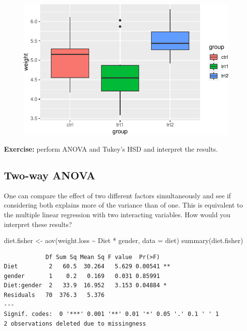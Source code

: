 \documentclass[
  letterpaper,
  DIV=11,
  numbers=noendperiod]{scrreprt}
\newenvironment{Shaded}{\begin{snugshade}}{\end{snugshade}}
\newcommand{\AttributeTok}[1]{\textcolor[rgb]{0.40,0.45,0.13}{#1}}
\newcommand{\FunctionTok}[1]{\textcolor[rgb]{0.28,0.35,0.67}{#1}}
\newcommand{\NormalTok}[1]{\textcolor[rgb]{0.00,0.23,0.31}{#1}}
\newcommand{\OtherTok}[1]{\textcolor[rgb]{0.00,0.23,0.31}{#1}}
\newcommand{\SpecialCharTok}[1]{\textcolor[rgb]{0.37,0.37,0.37}{#1}}
\begin{document}
\begin{figure}[H]

{\centering \includegraphics{./09-ANOVA_files/figure-pdf/unnamed-chunk-12-1.pdf}

}

\end{figure}

\textbf{Exercise:} perform ANOVA and Tukey's HSD and interpret the
results.

\hypertarget{two-way-anova}{%
\subsection{Two-way ANOVA}\label{two-way-anova}}

One can compare the effect of two different factors simultaneously and
see if considering both explains more of the variance than of one. This
is equivalent to the multiple linear regression with two interacting
variables. How would you interpret these results?

\begin{Shaded}
\begin{Highlighting}[]
\NormalTok{diet.fisher }\OtherTok{\textless{}{-}} \FunctionTok{aov}\NormalTok{(weight.loss }\SpecialCharTok{\textasciitilde{}}\NormalTok{ Diet }\SpecialCharTok{*}\NormalTok{ gender, }\AttributeTok{data =}\NormalTok{ diet)}
\FunctionTok{summary}\NormalTok{(diet.fisher)}
\end{Highlighting}
\end{Shaded}

\begin{verbatim}
            Df Sum Sq Mean Sq F value  Pr(>F)   
Diet         2   60.5  30.264   5.629 0.00541 **
gender       1    0.2   0.169   0.031 0.85991   
Diet:gender  2   33.9  16.952   3.153 0.04884 * 
Residuals   70  376.3   5.376                   
---
Signif. codes:  0 '***' 0.001 '**' 0.01 '*' 0.05 '.' 0.1 ' ' 1
2 observations deleted due to missingness
\end{verbatim}
\end{document}
